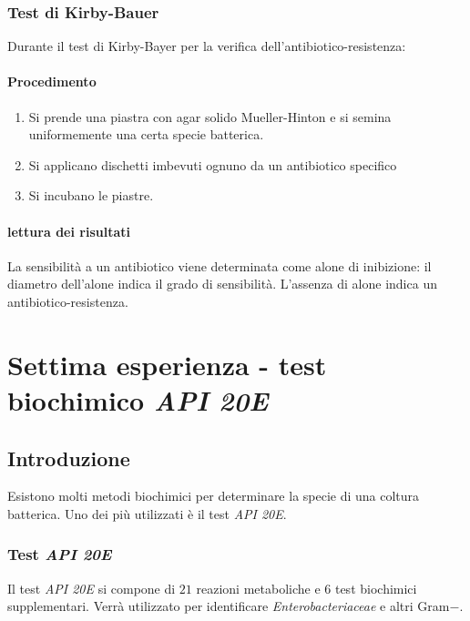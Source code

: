 		\subsubsection{Test di Kirby-Bauer}
		Durante il test di Kirby-Bayer per la verifica dell'antibiotico-resistenza:
			
			\paragraph{Procedimento}
			\begin{enumerate}
				\item Si prende una piastra con agar solido Mueller-Hinton e si semina uniformemente una certa specie batterica.
				\item Si applicano dischetti imbevuti ognuno da un antibiotico specifico
				\item Si incubano le piastre.
			\end{enumerate}

			\paragraph{lettura dei risultati}
			La sensibilit\`a a un antibiotico viene determinata come alone di inibizione: il diametro dell'alone indica il grado di sensibilit\`a.
			L'assenza di alone indica un antibiotico-resistenza.

\section{Settima esperienza - test biochimico \emph{API 20E}}

	\subsection{Introduzione}
	Esistono molti metodi biochimici per determinare la specie di una coltura batterica.
	Uno dei pi\`u utilizzati \`e il test \emph{API 20E}.

		\subsubsection{Test \emph{API 20E}}
		Il test \emph{API 20E} si compone di $21$ reazioni metaboliche e $6$ test biochimici supplementari.
		Verr\`a utilizzato per identificare \emph{Enterobacteriaceae} e altri Gram$-$.

